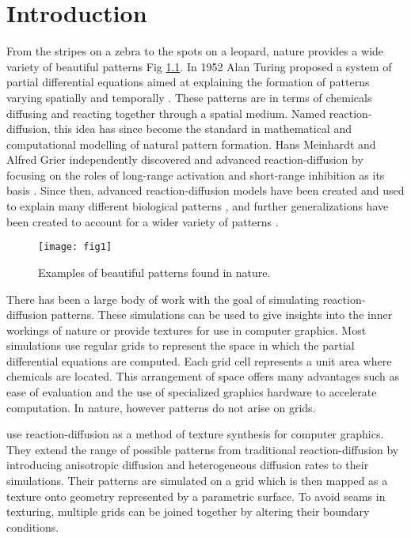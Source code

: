 \chapter{Introduction}
From the stripes on a zebra to the spots on a leopard, nature provides a wide variety of beautiful patterns Fig \ref{fig:naturalPatterns1}. In 1952 Alan Turing proposed a system of partial differential equations aimed at explaining the formation of patterns varying spatially and temporally \citep{Turing1952}. These patterns are in terms of chemicals diffusing and reacting together through a spatial medium. Named reaction-diffusion, this idea has since become the standard in mathematical and computational modelling of natural pattern formation. Hans Meinhardt and Alfred Grier independently discovered and advanced reaction-diffusion by focusing on the roles of long-range activation and short-range inhibition as its basis \citep{Gierer1972}. Since then, advanced reaction-diffusion models have been created and used to explain many different biological patterns \citep{GarzonAlvarado2011, fowler1992modeling, lefevre2010reaction}, and further generalizations have been created to account for a wider variety of patterns \citep{KONDO2017120}.

\begin{figure}[H]
  \centering
  \texttt{[image: fig1]}
  \caption{Examples of beautiful patterns found in nature.}
  \label{fig:naturalPatterns1}
\end{figure}

There has been a large body of work with the goal of simulating reaction-diffusion patterns. These simulations can be used to give insights into the inner workings of nature or provide textures for use in computer graphics. Most simulations use regular grids to represent the space in which the partial differential equations are computed. Each grid cell represents a unit area where chemicals are located. This arrangement of space offers many advantages such as ease of evaluation and the use of specialized graphics hardware to accelerate computation. In nature, however patterns do not arise on grids. 

\citet{Witkin1991} use reaction-diffusion as a method of texture synthesis for computer graphics. They extend the range of possible patterns from traditional reaction-diffusion by introducing anisotropic diffusion and heterogeneous diffusion rates to their simulations. Their patterns are simulated on a grid which is then mapped as a texture onto geometry represented by a parametric surface.  To avoid seams in texturing, multiple grids can be joined together by altering their boundary conditions. 


